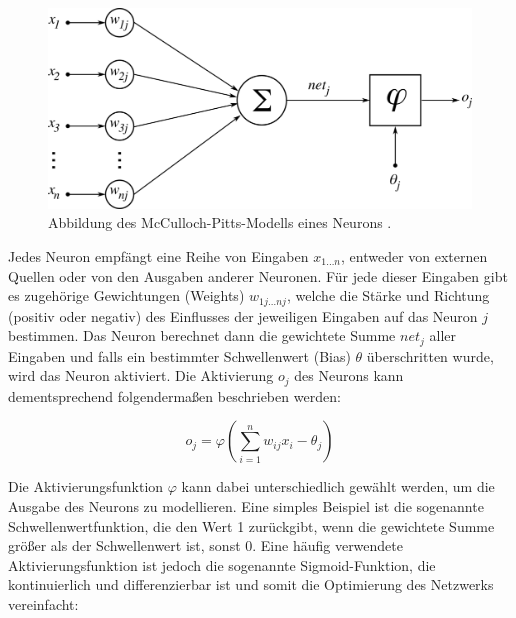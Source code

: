 \begin{figure}[h]
	\centering
	\vspace*{4mm}
	\includegraphics[width=12cm]{figure_mp-neuron_nd.png}
	\vspace*{2mm}
	\caption[Abbildung des McCulloch-Pitts-Modells eines Neurons.]{Abbildung des McCulloch-Pitts-Modells eines Neurons \parencite{WikiNeuronModel}.}
	\label{fig:neuron}
\end{figure}

Jedes Neuron empfängt eine Reihe von Eingaben $x_{1 \dots n}$, entweder von externen Quellen oder von den Ausgaben anderer Neuronen. Für jede dieser Eingaben gibt es zugehörige Gewichtungen (Weights) $w_{1j \dots nj}$, welche die Stärke und Richtung (positiv oder negativ) des Einflusses der jeweiligen Eingaben auf das Neuron $j$ bestimmen. Das Neuron berechnet dann die gewichtete Summe $net_j$ aller Eingaben und falls ein bestimmter Schwellenwert (Bias) $\theta$ überschritten wurde, wird das Neuron aktiviert. Die Aktivierung $o_j$ des Neurons kann dementsprechend folgendermaßen beschrieben werden:

\begin{equation}
	o_j = \varphi \left( \sum_{i=1}^{n} w_{ij} x_i - \theta_j \right)
	\label{eq:mp-neuron}
\end{equation}

Die Aktivierungsfunktion $\varphi$ kann dabei unterschiedlich gewählt werden, um die Ausgabe des Neurons zu modellieren. Eine simples Beispiel ist die sogenannte Schwellenwertfunktion, die den Wert 1 zurückgibt, wenn die gewichtete Summe größer als der Schwellenwert ist, sonst 0. Eine häufig verwendete Aktivierungsfunktion ist jedoch die sogenannte Sigmoid-Funktion, die kontinuierlich und differenzierbar ist und somit die Optimierung des Netzwerks vereinfacht:

